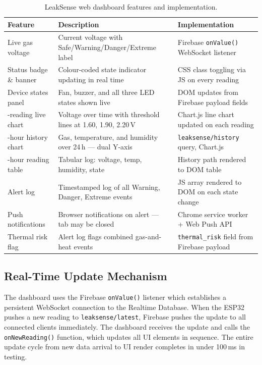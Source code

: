 \documentclass[a4paper,10pt,conference,onecolumn]{IEEEtran}
\begin{document}
\begin{table}[H]
\centering
\caption{LeakSense web dashboard features and implementation.}
\label{tab:dash}
\renewcommand{\arraystretch}{1.2}
\small
\setlength{\tabcolsep}{5pt}
\begin{tabularx}{\linewidth}{
  >{\raggedright\arraybackslash}p{2.8cm}
  >{\raggedright\arraybackslash}X
  >{\raggedright\arraybackslash}X}
\toprule
\textbf{Feature} & \textbf{Description} & \textbf{Implementation} \\
\midrule
Live gas voltage & Current voltage with Safe/Warning/Danger/Extreme label &
  Firebase \texttt{onValue()} WebSocket listener \\
Status badge \& banner & Colour-coded state indicator updating in real time &
  CSS class toggling via JS on every reading \\
Device states panel & Fan, buzzer, and all three LED states shown live &
  DOM updates from Firebase payload fields \\
60-reading live chart & Voltage over time with threshold lines at 1.60,
  1.90, 2.20\,V & Chart.js line chart updated on each reading \\
24-hour history chart & Gas, temperature, and humidity over 24\,h ---
  dual Y-axis & \texttt{leaksense/history} query, Chart.js \\
24-hour reading table & Tabular log: voltage, temp, humidity, state &
  History path rendered to DOM table \\
Alert log & Timestamped log of all Warning, Danger, Extreme events &
  JS array rendered to DOM on each state change \\
Push notifications & Browser notifications on alert --- tab may be closed &
  Chrome service worker + Web Push API \\
Thermal risk flag & Alert log flags combined gas-and-heat events &
  \texttt{thermal\_risk} field from Firebase payload \\
\bottomrule
\end{tabularx}
\end{table}

\subsection{Real-Time Update Mechanism}

The dashboard uses the Firebase \texttt{onValue()} listener which establishes
a persistent WebSocket connection to the Realtime Database. When the ESP32
pushes a new reading to \texttt{leaksense/latest}, Firebase pushes the update
to all connected clients immediately. The dashboard receives the update and
calls the \texttt{onNewReading()} function, which updates all UI elements in
sequence. The entire update cycle from new data arrival to UI render completes
in under 100\,ms in testing.
\end{document}
